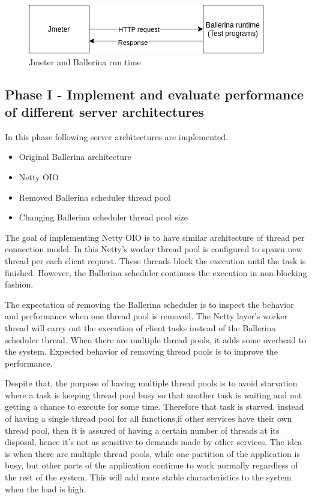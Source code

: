 \begin{figure}[htbp]
	\begin{center}
		\includegraphics[scale=0.5]{figures/jmeter_bal.png}
	\end{center}
	\caption{Jmeter and Ballerina run time}
	\label{jmeter_testing}
\end{figure}



\subsection{Phase I - Implement and evaluate performance of different server architectures}

In this phase following server architectures are implemented. 

 \begin{itemize}
 	\item Original Ballerina architecture
 	\item Netty OIO
 	\item Removed Ballerina scheduler thread pool
 	\item Changing Ballerina scheduler thread pool size
 \end{itemize} 

The goal of implementing Netty OIO is to have similar architecture of thread per connection model. In this Netty's worker thread pool is configured to spawn new thread per each client request. These threads block the execution until the task is finished. However, the Ballerina scheduler continues the execution in non-blocking fashion.

The expectation of removing the Ballerina scheduler is to  inspect the behavior and performance when one thread pool is removed. The Netty layer's worker thread will carry out the execution of client tasks instead of the Ballerina scheduler thread. When there are multiple thread pools, it adds some overhead to the system. Expected behavior of removing thread pools is to improve the performance. 

Despite that, the purpose of having multiple thread pools is to avoid starvation where a task is keeping thread pool busy so that another task is waiting and not getting a chance to execute for some time. Therefore that task is starved. instead of having a single thread pool for all functions,if other services have their own thread pool, then it is assured of having a certain number of threads at its disposal, hence it's not as sensitive to demands made by other services. The idea is when there are multiple thread pools, while one partition of the application is busy, but other parts of the application continue to work normally regardless of the rest of the system. This will add more stable characteristics to the system when the load is high.



